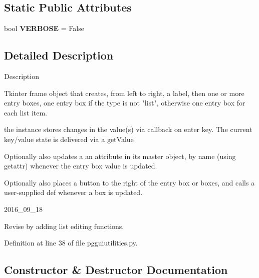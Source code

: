\subsection*{Static Public Attributes}
\begin{DoxyCompactItemize}
\item 
bool {\bfseries V\+E\+R\+B\+O\+SE} = False\hypertarget{classnegui_1_1pgguiutilities_1_1KeyValFrame_a7ab96ae24edc45cf94f7cf10bc412557}{}\label{classnegui_1_1pgguiutilities_1_1KeyValFrame_a7ab96ae24edc45cf94f7cf10bc412557}

\end{DoxyCompactItemize}


\subsection{Detailed Description}
\begin{DoxyVerb}Description

Tkinter frame object that creates,
from left to right, a label, then 
one or more entry boxes, one entry box 
if the type is not "list", otherwise one 
entry box for each list item.

the instance stores changes in the value(s)
via callback on enter key.  The current
key/value state is delivered via a getValue

Optionally also updates a an attribute
in its master object, by name (using getattr)
whenever the entry box value is updated.

Optionally also places a button to the right
of the entry box or boxes, and calls a user-supplied
def whenever a box is updated.

2016_09_18

Revise by adding list editing functions.\end{DoxyVerb}
 

Definition at line 38 of file pgguiutilities.\+py.



\subsection{Constructor \& Destructor Documentation}
